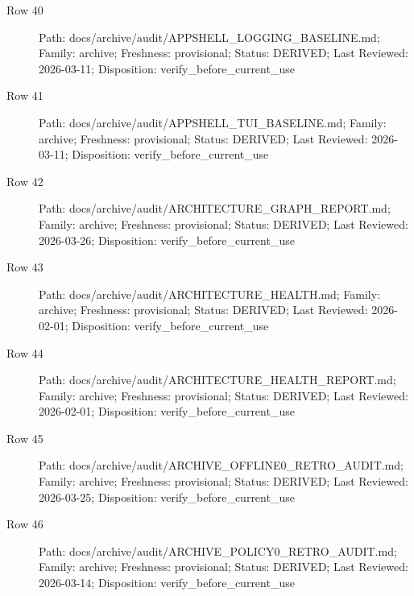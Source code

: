 \documentclass[10.5pt,a4paper,openany]{book}
\begin{document}
\begin{description}
\item[Row 40] Path: docs/\allowbreak{}archive/\allowbreak{}audit/\allowbreak{}APPSHELL\_\allowbreak{}LOGGING\_\allowbreak{}BASELINE.\allowbreak{}md; Family: archive; Freshness: provisional; Status: DERIVED; Last Reviewed: 2026-\allowbreak{}03-\allowbreak{}11; Disposition: verify\_\allowbreak{}before\_\allowbreak{}current\_\allowbreak{}use
\item[Row 41] Path: docs/\allowbreak{}archive/\allowbreak{}audit/\allowbreak{}APPSHELL\_\allowbreak{}TUI\_\allowbreak{}BASELINE.\allowbreak{}md; Family: archive; Freshness: provisional; Status: DERIVED; Last Reviewed: 2026-\allowbreak{}03-\allowbreak{}11; Disposition: verify\_\allowbreak{}before\_\allowbreak{}current\_\allowbreak{}use
\item[Row 42] Path: docs/\allowbreak{}archive/\allowbreak{}audit/\allowbreak{}ARCHITECTURE\_\allowbreak{}GRAPH\_\allowbreak{}REPORT.\allowbreak{}md; Family: archive; Freshness: provisional; Status: DERIVED; Last Reviewed: 2026-\allowbreak{}03-\allowbreak{}26; Disposition: verify\_\allowbreak{}before\_\allowbreak{}current\_\allowbreak{}use
\item[Row 43] Path: docs/\allowbreak{}archive/\allowbreak{}audit/\allowbreak{}ARCHITECTURE\_\allowbreak{}HEALTH.\allowbreak{}md; Family: archive; Freshness: provisional; Status: DERIVED; Last Reviewed: 2026-\allowbreak{}02-\allowbreak{}01; Disposition: verify\_\allowbreak{}before\_\allowbreak{}current\_\allowbreak{}use
\item[Row 44] Path: docs/\allowbreak{}archive/\allowbreak{}audit/\allowbreak{}ARCHITECTURE\_\allowbreak{}HEALTH\_\allowbreak{}REPORT.\allowbreak{}md; Family: archive; Freshness: provisional; Status: DERIVED; Last Reviewed: 2026-\allowbreak{}02-\allowbreak{}01; Disposition: verify\_\allowbreak{}before\_\allowbreak{}current\_\allowbreak{}use
\item[Row 45] Path: docs/\allowbreak{}archive/\allowbreak{}audit/\allowbreak{}ARCHIVE\_\allowbreak{}OFFLINE0\_\allowbreak{}RETRO\_\allowbreak{}AUDIT.\allowbreak{}md; Family: archive; Freshness: provisional; Status: DERIVED; Last Reviewed: 2026-\allowbreak{}03-\allowbreak{}25; Disposition: verify\_\allowbreak{}before\_\allowbreak{}current\_\allowbreak{}use
\item[Row 46] Path: docs/\allowbreak{}archive/\allowbreak{}audit/\allowbreak{}ARCHIVE\_\allowbreak{}POLICY0\_\allowbreak{}RETRO\_\allowbreak{}AUDIT.\allowbreak{}md; Family: archive; Freshness: provisional; Status: DERIVED; Last Reviewed: 2026-\allowbreak{}03-\allowbreak{}14; Disposition: verify\_\allowbreak{}before\_\allowbreak{}current\_\allowbreak{}use

\end{description}
\end{document}
